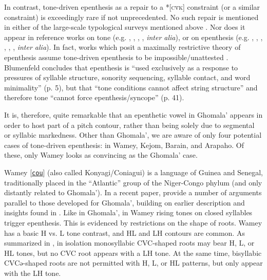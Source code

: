 \documentclass[output=paper,colorlinks,citecolor=brown,draft,draftmode]{langscibook}
\begin{document}
In contrast, tone-driven epenthesis as a repair to  a *[\textsc{c\v{v}k}] constraint (or a similar  constraint)  is exceedingly rare if not unprecedented. 
No such repair is mentioned in either of the large-scale typological surveys mentioned above \citep{gordon2001,zhang2013}.
Nor does it appear in reference works on tone (e.g.
\citealt{pike1948},
\citealt{fromkin1978},
\citealt{yip2002},
\citealt{wee2019}, 
\textit{inter alia}),
or on epenthesis (e.g.
\citealt{broselow_predicting_1982},
\citealt{ito_prosodic_1989},
\citealt{blumenfeld2006},
\citealt{de2006markedness},
\citealt{hall_cross-linguistic_2006},
\citealt{hall2011},
\textit{inter alia}).
In fact, works which posit a maximally restrictive theory of epenthesis assume tone-driven epenthesis to be impossible/unattested \citep{blumenfeld2006,gleim2019}.
Blumenfeld concludes that epenthesis is ``used exclusively as a response to pressures of syllable structure, sonority sequencing, syllable contact, and word minimality'' (p. 5), but that ``tone conditions cannot affect string structure'' and therefore tone ``cannot force epenthesis/syncope'' (p. 41).

It is, therefore,  quite remarkable that an epenthetic vowel in Ghomala' appears in order to host part of a pitch contour, rather than being solely due to segmental or syllabic markedness.
Other than Ghomala', we are aware of only four potential cases of tone-driven epenthesis: in Wamey, Kejom, Barain, and Arapaho. 
Of these, only Wamey looks as convincing as the Ghomala' case.

Wamey 
[\href{https://glottolog.org/resource/languoid/id/wame1240}{\texttt{cou}}] (also called Konyagi/Coniagui)
is a language of Guinea and Senegal, traditionally placed in the ``Atlantic'' group of the Niger-Congo phylum (and only distantly related to Ghomala').
In a recent paper, \citet{rollemerrill2022} provide a number of arguments parallel to those developed for Ghomala', building on earlier description and insights found in \citet{santos1996}. 
Like in Ghomala', in Wamey rising tones on closed syllables trigger epenthesis.
This is evidenced by restrictions on the shape of roots. 
Wamey has a basic H vs. L tone contrast, and HL and LH contours are common.
As summarized in , in isolation monosyllabic CVC-shaped roots may bear H, L, or HL tones, but no CVC root appears with a LH tone.
At the same time, bisyllabic CVCə-shaped roots are not permitted with H, L, or HL patterns, but only appear with the LH tone.
\end{document}
